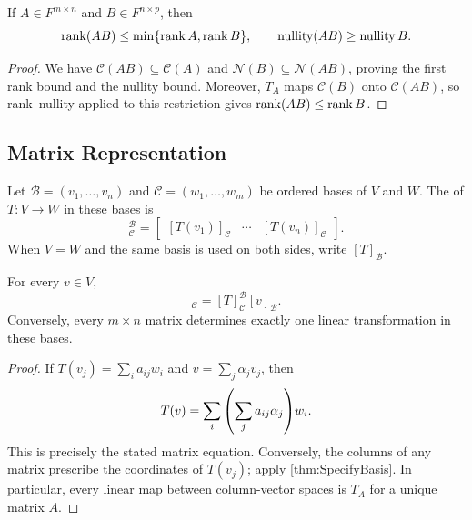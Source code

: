 \begin{Theorem}
If $A\in F^{m\times n}$ and $B\in F^{n\times p}$, then
\begin{equation*}
\rank(AB)\le\min\{\rank A,\rank B\},\qquad \operatorname{nullity}(AB)\ge\operatorname{nullity} B.
\end{equation*}
\end{Theorem}
\begin{proof}
We have $\mathcal C(AB)\subseteq\mathcal C(A)$ and $\mathcal N(B)\subseteq\mathcal N(AB)$, proving the first rank bound and the nullity bound. Moreover, $T_A$ maps $\mathcal C(B)$ onto $\mathcal C(AB)$, so rank--nullity applied to this restriction gives $\rank(AB)\le\rank B$.
\end{proof}

\subsection{Matrix Representation}

\begin{Definition}
Let $\mathcal B=(v_1,\ldots,v_n)$ and $\mathcal C=(w_1,\ldots,w_m)$ be ordered bases of $V$ and $W$. The  of $T\colon V\to W$ in these bases is
\begin{equation*}
[T]_{\mathcal C}^{\mathcal B}=\begin{bmatrix}[T(v_1)]_{\mathcal C}&\cdots&[T(v_n)]_{\mathcal C}\end{bmatrix}.
\end{equation*}
When $V=W$ and the same basis is used on both sides, write $[T]_{\mathcal B}$.
\end{Definition}

\begin{Theorem}\label{thm:MatrixCoordinates}
For every $v\in V$,
\begin{equation*}
[T(v)]_{\mathcal C}=[T]_{\mathcal C}^{\mathcal B}[v]_{\mathcal B}.
\end{equation*}
Conversely, every $m\times n$ matrix determines exactly one linear transformation in these bases.
\end{Theorem}
\begin{proof}
If $T(v_j)=\sum_i a_{ij}w_i$ and $v=\sum_j\alpha_jv_j$, then
\begin{equation*}
T(v)=\sum_i\pqty{\sum_j a_{ij}\alpha_j}w_i.
\end{equation*}
This is precisely the stated matrix equation. Conversely, the columns of any matrix prescribe the coordinates of $T(v_j)$; apply \cref{thm:SpecifyBasis}. In particular, every linear map between column-vector spaces is $T_A$ for a unique matrix $A$.
\end{proof}

